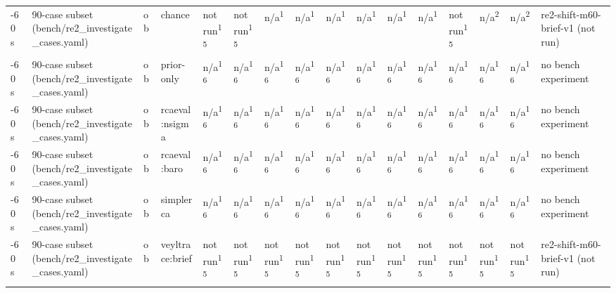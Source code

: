 \begin{table}[t]
\begin{tabular}{llllllllllllllll}
-60 s & 90-case subset (bench/re2\_investigate\_cases.yaml) & ob & chance & not run\textsuperscript{15} & not run\textsuperscript{15} & n/a\textsuperscript{1} & n/a\textsuperscript{1} & n/a\textsuperscript{1} & n/a\textsuperscript{1} & n/a\textsuperscript{1} & n/a\textsuperscript{1} & not run\textsuperscript{15} & n/a\textsuperscript{2} & n/a\textsuperscript{2} & re2-shift-m60-brief-v1 (not run) \\
-60 s & 90-case subset (bench/re2\_investigate\_cases.yaml) & ob & prior-only & n/a\textsuperscript{16} & n/a\textsuperscript{16} & n/a\textsuperscript{16} & n/a\textsuperscript{16} & n/a\textsuperscript{16} & n/a\textsuperscript{16} & n/a\textsuperscript{16} & n/a\textsuperscript{16} & n/a\textsuperscript{16} & n/a\textsuperscript{16} & n/a\textsuperscript{16} & no bench experiment \\
-60 s & 90-case subset (bench/re2\_investigate\_cases.yaml) & ob & rcaeval:nsigma & n/a\textsuperscript{16} & n/a\textsuperscript{16} & n/a\textsuperscript{16} & n/a\textsuperscript{16} & n/a\textsuperscript{16} & n/a\textsuperscript{16} & n/a\textsuperscript{16} & n/a\textsuperscript{16} & n/a\textsuperscript{16} & n/a\textsuperscript{16} & n/a\textsuperscript{16} & no bench experiment \\
-60 s & 90-case subset (bench/re2\_investigate\_cases.yaml) & ob & rcaeval:baro & n/a\textsuperscript{16} & n/a\textsuperscript{16} & n/a\textsuperscript{16} & n/a\textsuperscript{16} & n/a\textsuperscript{16} & n/a\textsuperscript{16} & n/a\textsuperscript{16} & n/a\textsuperscript{16} & n/a\textsuperscript{16} & n/a\textsuperscript{16} & n/a\textsuperscript{16} & no bench experiment \\
-60 s & 90-case subset (bench/re2\_investigate\_cases.yaml) & ob & simplerca & n/a\textsuperscript{16} & n/a\textsuperscript{16} & n/a\textsuperscript{16} & n/a\textsuperscript{16} & n/a\textsuperscript{16} & n/a\textsuperscript{16} & n/a\textsuperscript{16} & n/a\textsuperscript{16} & n/a\textsuperscript{16} & n/a\textsuperscript{16} & n/a\textsuperscript{16} & no bench experiment \\
-60 s & 90-case subset (bench/re2\_investigate\_cases.yaml) & ob & veyltrace:brief & not run\textsuperscript{15} & not run\textsuperscript{15} & not run\textsuperscript{15} & not run\textsuperscript{15} & not run\textsuperscript{15} & not run\textsuperscript{15} & not run\textsuperscript{15} & not run\textsuperscript{15} & not run\textsuperscript{15} & not run\textsuperscript{15} & not run\textsuperscript{15} & re2-shift-m60-brief-v1 (not run) \\

\end{tabular}
\end{table}
